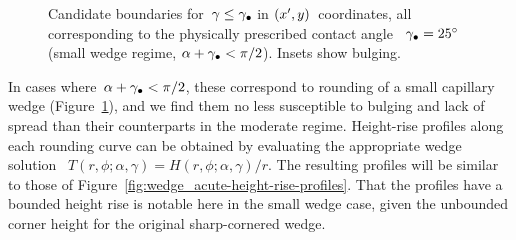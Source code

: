 \begin{figure}
  \newcommand*{\subfigurewidth}{0.31\textwidth}
  \begin{subfigure}[t]{\subfigurewidth}
  \end{subfigure}
  \hfill
  \begin{subfigure}[t]{\subfigurewidth}
  \end{subfigure}
  \hfill
  \begin{subfigure}[t]{\subfigurewidth}
  \end{subfigure}
  \caption{
    Candidate boundaries for~$\gamma \le \gamma_\bullet$
    in $(x', y)$~coordinates,
    all corresponding to the physically prescribed contact angle~%
    $\gamma_\bullet = \SI{25}{\degree}$
    (small wedge regime, $\alpha + \gamma_\bullet < \pi/2$).
    Insets show bulging.
  }
  \label{fig:wedge_small-small-candidates-offset}
\end{figure}

In cases where~$\alpha + \gamma_\bullet < \pi/2$,
these correspond to rounding of a small capillary wedge
(Figure~\ref{fig:wedge_small-small-candidates-offset}),
and we find them no less susceptible to bulging and lack of spread
than their counterparts in the moderate regime.
Height-rise profiles along each rounding curve can be obtained
by evaluating the appropriate wedge solution~%
  $T (r, \phi; \alpha, \gamma) = H (r, \phi; \alpha, \gamma) / r$.
The resulting profiles will be similar to those
of Figure~\ref{fig:wedge_acute-height-rise-profiles}.
That the profiles have a bounded height rise
is notable here in the small wedge case,
given the unbounded corner height
for the original sharp-cornered wedge.

